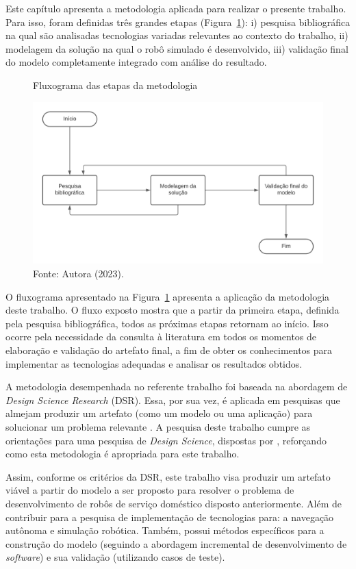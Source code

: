 
Este capítulo apresenta a metodologia aplicada para realizar o presente trabalho. Para isso, foram definidas três grandes etapas (Figura~\ref{fig:fluxogramaMetodologia}): i) pesquisa bibliográfica na qual são analisadas tecnologias variadas relevantes ao contexto do trabalho, ii) modelagem da solução na qual o robô simulado é desenvolvido, iii) validação final do modelo completamente integrado com análise do resultado. 


\begin{figure}[H]
    \centering
    \caption{Fluxograma das etapas da metodologia}
    \includegraphics[scale=0.8]{fluxogramaMetodologia.png}
    \caption*{Fonte: Autora (2023).}
    \label{fig:fluxogramaMetodologia}
\end{figure}

O fluxograma apresentado na Figura~\ref{fig:fluxogramaMetodologia} apresenta a aplicação da metodologia deste trabalho. O fluxo exposto mostra que a partir da primeira etapa, definida pela pesquisa bibliográfica, todos as próximas etapas retornam ao início. Isso ocorre pela necessidade da consulta à literatura em todos os momentos de elaboração e validação do artefato final, a fim de obter os conhecimentos para implementar as tecnologias adequadas e analisar os resultados obtidos.

A metodologia desempenhada no referente trabalho foi baseada na abordagem de \textit{Design Science Research} (DSR). Essa, por sua vez, é aplicada em pesquisas que almejam produzir um artefato (como um modelo ou uma aplicação) para solucionar um problema relevante \cite{dsrBook:2015}. A pesquisa deste trabalho cumpre as orientações para uma pesquisa de \textit{Design Science}, dispostas por \citet{dsrIS:2004}, reforçando como esta metodologia é apropriada para este trabalho. 

Assim, conforme os critérios da DSR, este trabalho visa produzir um artefato viável a partir do modelo a ser proposto para resolver o problema de desenvolvimento de robôs de serviço doméstico disposto anteriormente. Além de contribuir para a pesquisa de implementação de tecnologias para: a navegação autônoma e simulação robótica. Também, possui métodos específicos para a construção do modelo (seguindo a abordagem incremental de desenvolvimento de \textit{software}) e sua validação (utilizando casos de teste).


